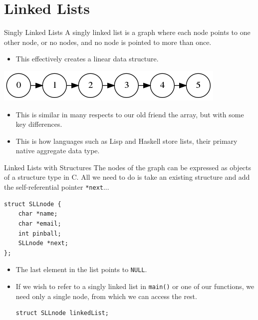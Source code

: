 \documentclass[11pt]{beamer}
\begin{document}




\section[Linked Lists]{Linked Lists}
\begin{frame}{Singly Linked Lists}
A singly linked list is a graph where each node points to one other node, or no nodes, and no node is pointed to more than once.  
\begin{itemize}
\item This effectively creates a linear data structure.
\end{itemize}
\center
\includegraphics[scale=0.3]{SLL_simple.png}
\flushright
\begin{itemize}
\item This is similar in many respects to our old friend the array, but with some key differences.  
\item This is how languages such as Lisp and Haskell store lists, their primary native aggregate data type. 
\end{itemize}
\end{frame}

\begin{frame}[fragile=singleslide]{Linked Lists with Structures}
The nodes of the graph can be expressed as objects of a structure type in C.  All we need to do is take an existing structure and add the self-referential pointer \texttt{*next}...
\begin{lstlisting}[style=C]
struct SLLnode {
	char *name;
	char *email;
	int pinball;
	SLLnode *next;
};
\end{lstlisting} 
\begin{itemize}
\item The last element in the list points to \texttt{NULL}.
\item If we wish to refer to a singly linked list in \texttt{main()} or one of our functions, we need only a single node, from which we can access the rest.
\begin{lstlisting}[style=C]
struct SLLnode linkedList;
\end{lstlisting} 
\end{itemize}
\end{frame}
\end{document}
